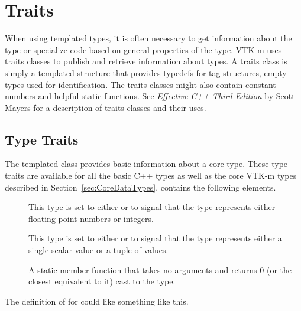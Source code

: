 \section{Traits}
\label{sec:Traits}


When using templated types, it is often necessary to get information about
the type or specialize code based on general properties of the type. VTK-m
uses traits classes to publish and retrieve information about types. A
traits class is simply a templated structure that provides typedefs for
tag structures, empty types used for identification. The traits
classes might also contain constant numbers and helpful static
functions. See {\it Effective C++ Third Edition} by Scott Mayers for a
description of traits classes and their uses.

\subsection{Type Traits}


The  templated class provides basic information
about a core type. These type traits are available for all the basic C++
types as well as the core VTK-m types described in
Section~\ref{sec:CoreDataTypes}.  contains the following
elements.


\begin{description}
\item[]  
  This type is set to either  or
   to signal that the type represents either
  floating point numbers or integers.
\item[] 
   This type is set to either
   or  to signal that
  the type represents either a single scalar value or a tuple of values.
\item[] 
  A static member function that takes no arguments and returns 0 (or the closest equivalent to it) cast to the type.
\end{description}

The definition of  for  could like something
like this.

